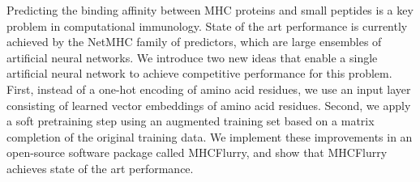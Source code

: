 Predicting the binding affinity between MHC proteins and small peptides is a key problem in computational immunology. State of the art performance is currently achieved by the NetMHC family of predictors, which are large ensembles of artificial neural networks. We introduce two new ideas that enable a single artificial neural network to achieve competitive performance for this problem. First, instead of a one-hot encoding of amino acid residues, we use an input layer consisting of learned vector embeddings of amino acid residues. Second, we apply a soft pretraining step using an augmented training set based on a matrix completion of the original training data. We implement these improvements in an open-source software package called MHCFlurry, and show that MHCFlurry achieves state of the art performance. 
